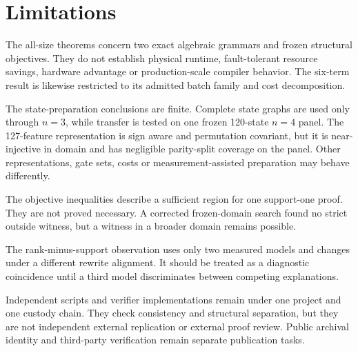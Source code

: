\section{Limitations}

The all-size theorems concern two exact algebraic grammars and frozen structural objectives.  They do not establish physical runtime, fault-tolerant resource savings, hardware advantage or production-scale compiler behavior.  The six-term result is likewise restricted to its admitted batch family and cost decomposition.

The state-preparation conclusions are finite.  Complete state graphs are used only through $n=3$, while transfer is tested on one frozen 120-state $n=4$ panel.  The 127-feature representation is sign aware and permutation covariant, but it is near-injective in domain and has negligible parity-split coverage on the panel.  Other representations, gate sets, costs or measurement-assisted preparation may behave differently.

The objective inequalities describe a sufficient region for one support-one proof.  They are not proved necessary.  A corrected frozen-domain search found no strict outside witness, but a witness in a broader domain remains possible.

The rank-minus-support observation uses only two measured models and changes under a different rewrite alignment.  It should be treated as a diagnostic coincidence until a third model discriminates between competing explanations.

Independent scripts and verifier implementations remain under one project and one custody chain.  They check consistency and structural separation, but they are not independent external replication or external proof review.  Public archival identity and third-party verification remain separate publication tasks.
